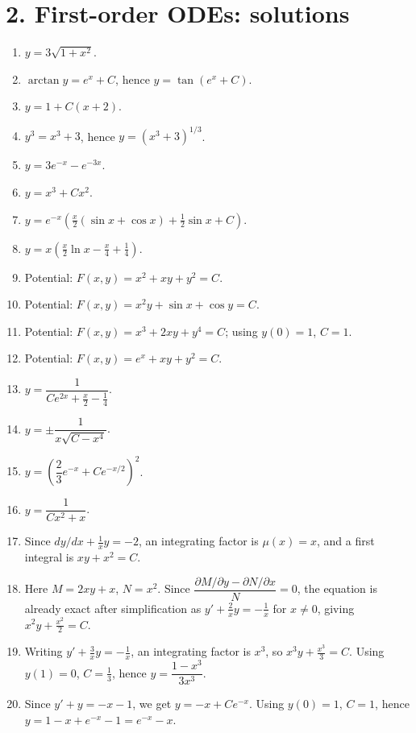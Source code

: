 \documentclass[11pt,a4paper]{article}
\begin{document}
\section*{2. First-order ODEs: solutions}
\begin{enumerate}
    \item $y=3\sqrt{1+x^2}$.
    \item $\arctan y=e^x+C$, hence $y=\tan(e^x+C)$.
    \item $y=1+C(x+2)$.
    \item $y^3=x^3+3$, hence $y=(x^3+3)^{1/3}$.
    \item $y=3e^{-x}-e^{-3x}$.
    \item $y=x^3+Cx^2$.
    \item $y=e^{-x}\!\left(\frac{x}{2}(\sin x+\cos x)+\frac{1}{2}\sin x+C\right)$.
    \item $y=x\left(\frac{x}{2}\ln x-\frac{x}{4}+\frac{1}{4}\right)$.
    \item Potential: $F(x,y)=x^2+xy+y^2=C$.
    \item Potential: $F(x,y)=x^2y+\sin x+\cos y=C$.
    \item Potential: $F(x,y)=x^3+2xy+y^4=C$; using $y(0)=1$, $C=1$.
    \item Potential: $F(x,y)=e^x+xy+y^2=C$.
    \item $y=\dfrac{1}{Ce^{2x}+\frac{x}{2}-\frac14}$.
    \item $y=\pm\dfrac{1}{x\sqrt{C-x^4}}$.
    \item $y=\left(\dfrac{2}{3}e^{-x}+Ce^{-x/2}\right)^2$.
    \item $y=\dfrac{1}{Cx^2+x}$.
    \item Since $dy/dx+\frac{1}{x}y=-2$, an integrating factor is $\mu(x)=x$, and a first integral is $xy+x^2=C$.
    \item Here $M=2xy+x$, $N=x^2$. Since $\dfrac{\partial M/\partial y-\partial N/\partial x}{N}=0$, the equation is already exact after simplification as $y'+\frac{2}{x}y=-\frac{1}{x}$ for $x\neq 0$, giving $x^2y+\frac{x^2}{2}=C$.
    \item Writing $y'+\frac{3}{x}y=-\frac{1}{x}$, an integrating factor is $x^3$, so $x^3y+\frac{x^3}{3}=C$. Using $y(1)=0$, $C=\frac13$, hence $y=\dfrac{1-x^3}{3x^3}$.
    \item Since $y'+y=-x-1$, we get $y=-x+Ce^{-x}$. Using $y(0)=1$, $C=1$, hence $y=1-x+e^{-x}-1=e^{-x}-x$.
\end{enumerate}
\end{document}
